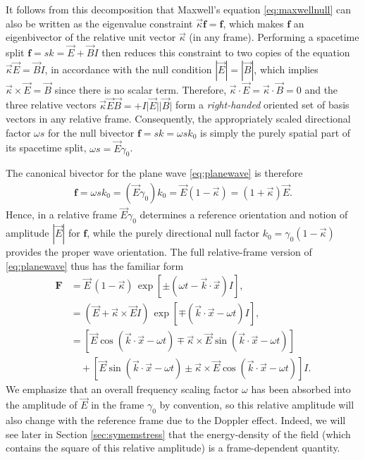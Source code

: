 \documentclass[1p,sort&compress]{elsarticle}
\numberwithin{equation}{section}
\newcommand{\rv}[1]{\vec{#1}}
\newcommand{\abs}[1]{\lvert #1 \rvert}
\newcommand{\bv}[1]{\mathbf{#1}}
\begin{document}
It follows from this decomposition that Maxwell's equation \eqref{eq:maxwellnull} can also be written as the eigenvalue constraint $\rv{\kappa}\bv{f} = \bv{f}$, which makes $\bv{f}$ an eigenbivector of the relative unit vector $\rv{\kappa}$ (in any frame).  Performing a spacetime split $\bv{f} = sk = \rv{E} + \rv{B}I$ then reduces this constraint to two copies of the equation $\rv{\kappa}\rv{E} = \rv{B}I$, in accordance with the null condition $|\rv{E}| = |\rv{B}|$, which implies $\rv{\kappa}\times\rv{E} = \rv{B}$ since there is no scalar term.  Therefore, $\rv{\kappa}\cdot\rv{E} = \rv{\kappa}\cdot\rv{B} = 0$ and the three relative vectors $\rv{\kappa}\rv{E}\rv{B} = +I\abs{\rv{E}}\abs{\rv{B}}$ form a \emph{right-handed} oriented set of basis vectors in any relative frame.  Consequently, the appropriately scaled directional factor $\omega s$ for the null bivector $\bv{f} = sk = \omega sk_0$ is simply the purely spatial part of its spacetime split, $\omega s = \rv{E}\gamma_0$.  

The canonical bivector for the plane wave \eqref{eq:planewave} is therefore 
\begin{align}
  \bv{f} = \omega sk_0 = (\rv{E}\gamma_0)k_0 = \rv{E}(1-\rv{\kappa}) = (1+\rv{\kappa})\rv{E}.
\end{align}
Hence, in a relative frame $\rv{E}\gamma_0$ determines a reference orientation and notion of amplitude $|\rv{E}|$ for $\bv{f}$, while the purely directional null factor $k_0 = \gamma_0(1-\rv{\kappa})$ provides the proper wave orientation.  The full relative-frame version of \eqref{eq:planewave} thus has the familiar form
\begin{align}\label{eq:planewaverelative}
  \bv{F} &= \rv{E}\,(1 - \rv{\kappa})\,\exp[\pm(\omega t - \rv{k}\cdot\rv{x})I], \\
  &= (\rv{E} + \rv{\kappa}\times\rv{E}I)\,\exp[\mp(\rv{k}\cdot\rv{x} - \omega t)I], \nonumber \\
  &= [\rv{E}\cos(\rv{k}\cdot\rv{x} - \omega t) \mp \rv{\kappa}\times\rv{E}\sin(\rv{k}\cdot\rv{x} - \omega t)] \nonumber \\
  &\quad + [\rv{E}\sin(\rv{k}\cdot\rv{x} - \omega t) \pm \rv{\kappa}\times\rv{E}\cos(\rv{k}\cdot\rv{x} - \omega t)]I. \nonumber
\end{align}
We emphasize that an overall frequency scaling factor $\omega$ has been absorbed into the amplitude of $\rv{E}$ in the frame $\gamma_0$ by convention, so this relative amplitude will also change with the reference frame due to the Doppler effect.  Indeed, we will see later in Section \ref{sec:symemstress} that the energy-density of the field (which contains the square of this relative amplitude) is a frame-dependent quantity.
\end{document}
